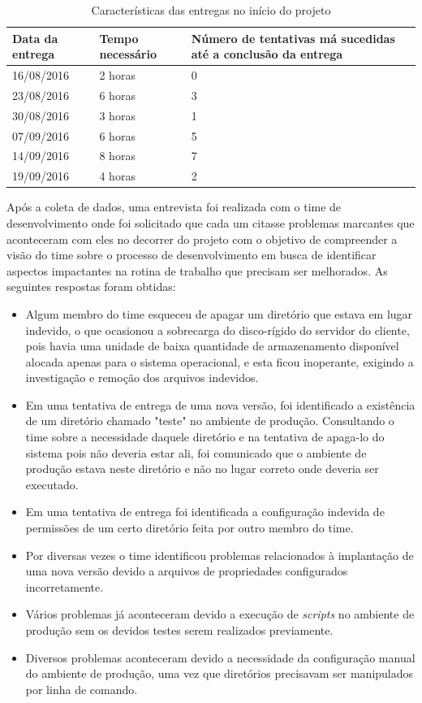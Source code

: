 \documentclass[
12pt,				%
openright,			%
oneside,			%
a4paper,			%
english,			%
french,				%
spanish,			%
brazil,				%
]{abntex2}
\begin{document}
\begin{table}[htb]
	\caption{Características das entregas no início do projeto}
	
	\label{tab-deploys}	
	\begin{tabular}{p{3.85cm}|p{5.20cm}|p{5.20cm}}
		\textbf{Data da entrega} & \textbf{Tempo necessário} & \textbf{Número de tentativas má sucedidas até a conclusão da entrega}  \\
		\hline
		16/08/2016 & 2 horas & 0 \\
		\hline
		23/08/2016 & 6 horas & 3 \\
		\hline
		30/08/2016 & 3 horas & 1 \\
		\hline
		07/09/2016 & 6 horas & 5 \\
		\hline
		14/09/2016 & 8 horas & 7 \\
		\hline
		19/09/2016 & 4 horas & 2 \\
	\end{tabular}
\end{table}

Após a coleta de dados, uma entrevista foi realizada com o time de desenvolvimento onde foi solicitado que cada um citasse problemas marcantes que aconteceram com eles no decorrer do projeto com o objetivo de compreender a visão do time sobre o processo de desenvolvimento em busca de identificar aspectos impactantes na rotina de trabalho que precisam ser melhorados. As seguintes respostas foram obtidas:

\begin{itemize}  
	\item Algum membro do time esqueceu de apagar um diretório que estava em lugar indevido, o que ocasionou a sobrecarga do disco-rígido do servidor do cliente, pois havia uma unidade de baixa quantidade de armazenamento disponível alocada apenas para o sistema operacional, e esta ficou inoperante, exigindo a investigação e remoção dos arquivos indevidos.
	\item Em uma tentativa de entrega de uma nova versão, foi identificado a existência de um diretório chamado "teste" no ambiente de produção. Consultando o time sobre a necessidade daquele diretório e na tentativa de apaga-lo do sistema pois não deveria estar ali, foi comunicado que o ambiente de produção estava neste diretório e não no lugar correto onde deveria ser executado.
	\item Em uma tentativa de entrega foi identificada a configuração indevida de permissões de um certo diretório feita por outro membro do time.
	\item Por diversas vezes o time identificou problemas relacionados à implantação de uma nova versão devido a arquivos de propriedades configurados incorretamente.
	\item Vários problemas já aconteceram devido a execução de \textit{scripts} no ambiente de produção sem os devidos testes serem realizados previamente.
	\item Diversos problemas aconteceram devido a necessidade da configuração manual do ambiente de produção, uma vez que diretórios precisavam ser manipulados por linha de comando.
\end{itemize}
\end{document}

